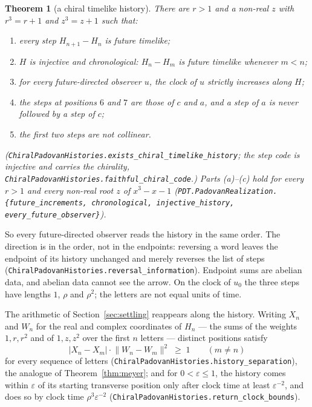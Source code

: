 \documentclass[11pt]{amsart}
\theoremstyle{plain}
\newtheorem{theorem}{Theorem}[section]
\theoremstyle{definition}
\theoremstyle{remark}
\begin{document}
\begin{theorem}[a chiral timelike history]\label{thm:history}
There are $r > 1$ and a non-real $z$ with $r^3 = r + 1$ and $z^3 = z + 1$ such that:
\begin{enumerate}
\item[(a)] every step $H_{n+1} - H_n$ is future timelike;
\item[(b)] $H$ is injective and chronological: $H_n - H_m$ is future timelike whenever $m < n$;
\item[(c)] for \emph{every} future-directed observer $u$, the clock of $u$ strictly increases
along $H$;
\item[(d)] the steps at positions $6$ and $7$ are those of $c$ and $a$, and a step of $a$ is
never followed by a step of $c$;
\item[(e)] the first two steps are not collinear.
\end{enumerate}
\textup{(\texttt{ChiralPadovanHistories.exists\_chiral\_timelike\_history}; the step code is
injective and carries the chirality, \texttt{ChiralPadovanHistories.faithful\_chiral\_code}.)}
Parts (a)--(c) hold for every $r > 1$ and every non-real root $z$ of $x^3 - x - 1$
\textup{(\texttt{PDT.PadovanRealization.\{future\_increments, chronological,
injective\_history, every\_future\_observer\}})}.
\end{theorem}

So every future-directed observer reads the history in the same order. The direction is in the
order, not in the endpoints: reversing a word leaves the endpoint of its history unchanged
and merely reverses the list of steps (\texttt{ChiralPadovanHistories.reversal\_information}).
Endpoint sums are abelian data, and abelian data cannot see the arrow. On the clock of $u_0$
the three steps have lengths $1$, $\rho$ and $\rho^2$; the letters are not equal units of time.

The arithmetic of Section~\ref{sec:settling} reappears along the history. Writing $X_n$ and
$W_n$ for the real and complex coordinates of $H_n$ --- the sums of the weights $1, r, r^2$
and of $1, z, z^2$ over the first $n$ letters --- distinct positions satisfy
\[
  \lvert X_n - X_m \rvert \cdot \lVert W_n - W_m \rVert^2 \;\ge\; 1 \qquad (m \ne n)
\]
for every sequence of letters (\texttt{ChiralPadovanHistories.history\_separation}), the
analogue of Theorem~\ref{thm:meyer}; and for $0<\varepsilon\le 1$, the history comes within
$\varepsilon$ of its starting transverse position only after clock time at least
$\varepsilon^{-2}$, and does so by clock time $\rho^3\varepsilon^{-2}$
(\texttt{ChiralPadovanHistories.return\_clock\_bounds}).
\end{document}
